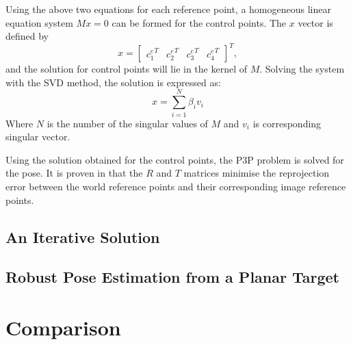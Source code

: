 Using the above two equations for each reference point, a homogeneous linear equation system $Mx = 0$ can be formed for the control points.
The $x$ vector is defined by
\begin{equation}
x = 
	\begin{bmatrix}
		{c_1^c}^T & {c_2^c}^T & {c_3^c}^T & {c_4^c}^T
	\end{bmatrix}^T,
\end{equation}
and the solution for control points will lie in the kernel of $M$.
Solving the system with the SVD method, the solution is expressed as:
\begin{equation}
	x = \sum_{i=1}^{N} \beta_i v_i
\end{equation}
Where $N$ is the number of the singular values of $M$ and $v_i$ is corresponding singular vector.

Using the solution obtained for the control points, the P3P problem is solved for the pose.
It is proven in \cite{Lepetit2008} that the $R$ and $T$ matrices minimise the reprojection error between the world reference points and their corresponding image reference points.

\subsection{An Iterative Solution}

\subsection{Robust Pose Estimation from a Planar Target}

\section{Comparison}

